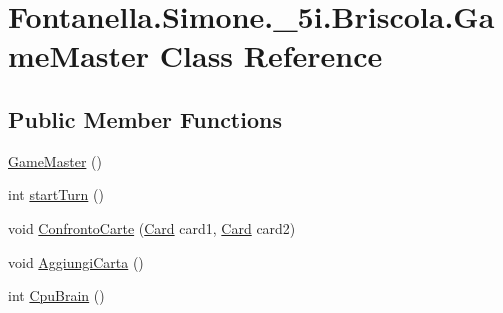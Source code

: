 \hypertarget{class_fontanella_1_1_simone_1_1__5i_1_1_briscola_1_1_game_master}{}\section{Fontanella.\+Simone.\+\_\+5i.\+Briscola.\+Game\+Master Class Reference}
\label{class_fontanella_1_1_simone_1_1__5i_1_1_briscola_1_1_game_master}
\subsection*{Public Member Functions}
\begin{DoxyCompactItemize}
\item 
\hyperlink{class_fontanella_1_1_simone_1_1__5i_1_1_briscola_1_1_game_master_a8ccf5663cf434aba91fb49c93ad1971e}{Game\+Master} ()
\item 
int \hyperlink{class_fontanella_1_1_simone_1_1__5i_1_1_briscola_1_1_game_master_a43255b1c949556008efd7d22256fd294}{start\+Turn} ()
\item 
void \hyperlink{class_fontanella_1_1_simone_1_1__5i_1_1_briscola_1_1_game_master_af7df7cf04ba55033629ead2c41723821}{Confronto\+Carte} (\hyperlink{class_fontanella_1_1_simone_1_1__5i_1_1_briscola_1_1_card}{Card} card1, \hyperlink{class_fontanella_1_1_simone_1_1__5i_1_1_briscola_1_1_card}{Card} card2)
\item 
void \hyperlink{class_fontanella_1_1_simone_1_1__5i_1_1_briscola_1_1_game_master_a0daac357a7038fb2229cd916050ff1de}{Aggiungi\+Carta} ()
\item 
int \hyperlink{class_fontanella_1_1_simone_1_1__5i_1_1_briscola_1_1_game_master_affb9a5a6fa94208a622c976f9d3cf6bd}{Cpu\+Brain} ()
\end{DoxyCompactItemize}
